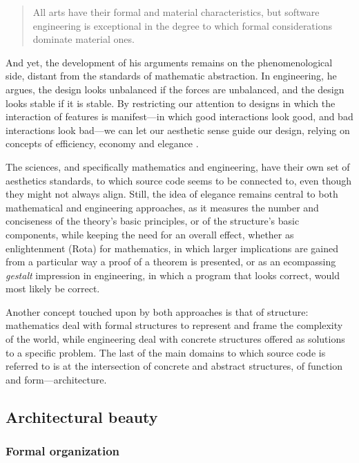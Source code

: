 \begin{quote}
  All arts have their formal and material characteristics, but software engineering is exceptional in the degree to which formal considerations dominate material ones. \citep{schummer_aesthetic_2009}
\end{quote}

And yet, the development of his arguments remains on the phenomenological side, distant from the standards of mathematic abstraction. In engineering, he argues, the design looks unbalanced if the forces are unbalanced, and the design looks stable if it is stable.  By restricting our attention to designs in which the interaction of features is manifest—in which good interactions look good, and bad interactions look bad—we can let our aesthetic sense guide our design, relying on concepts of efficiency, economy and elegance \citep{mclennan_who_1997}.

\vspace{1\baselineskip}

The sciences, and specifically mathematics and engineering, have their own set of aesthetics standards, to which source code seems to be connected to, even though they might not always align. Still, the idea of elegance remains central to both mathematical and engineering approaches, as it measures the number and conciseness of the theory's basic principles, or of the structure's basic components, while keeping the need for an overall effect, whether as enlightenment (Rota) for mathematics, in which larger implications are gained from a particular way a proof of a theorem is presented, or as an ecompassing \emph{gestalt} impression in engineering, in which a program that looks correct, would most likely be correct.

Another concept touched upon by both approaches is that of structure: mathematics deal with formal structures to represent and frame the complexity of the world, while engineering deal with concrete structures offered as solutions to a specific problem. The last of the main domains to which source code is referred to is at the intersection of concrete and abstract structures, of function and form—architecture.

\subsection{Architectural beauty}

\subsubsection{Formal organization}

